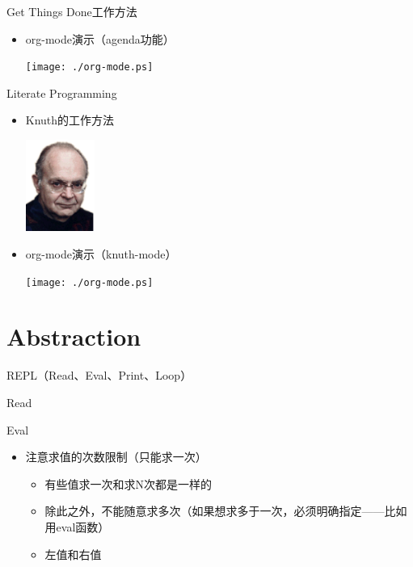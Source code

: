 \documentclass[presentation,dvipdfmx,CJKbookmarks]{beamer}
\begin{document}
\begin{CJK*}{UTF8}{simsun}
\begin{frame}[label={sec:orgb84cf5c}]{Get Things Done\thinspace 工作方法}
\begin{itemize}
\item org-mode\thinspace 演示（agenda\thinspace 功能）

\begin{center}
\texttt{[image: ./org-mode.ps]}
\end{center}
\end{itemize}
\end{frame}

\begin{frame}[label={sec:org6de450a}]{Literate Programming}
\begin{itemize}
\item Knuth\thinspace 的工作方法

\begin{center}
\includegraphics[height=3cm]{./knuth.ps}
\end{center}

\item org-mode\thinspace 演示（knuth-mode）

\begin{center}
\texttt{[image: ./org-mode.ps]}
\end{center}
\end{itemize}
\end{frame}

\section{Abstraction}
\label{sec:org784d023}

\begin{frame}[label={sec:orgedc3c81}]{REPL（Read、Eval、Print、Loop）}
\begin{block}{Read}
\end{block}
\begin{block}{Eval}
\begin{itemize}
\item 注意求值的次数限制（只能求一次）
\begin{itemize}
\item 有些值求一次和求\thinspace N\thinspace 次都是一样的
\item 除此之外，不能随意求多次（如果想求多于一次，必须明确指定——比如用\thinspace eval\thinspace 函数）
\item 左值和右值
\end{itemize}
\end{itemize}
\end{block}


\end{frame}
\end{CJK*}
\end{document}
